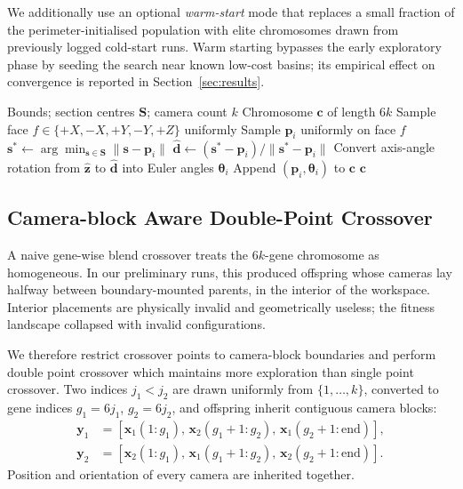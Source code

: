 \documentclass[conference]{IEEEtran}
\begin{document}
We additionally use an optional \emph{warm-start} mode that replaces a small fraction of the perimeter-initialised population with elite chromosomes drawn from previously logged cold-start runs. Warm starting bypasses the early exploratory phase by seeding the search near known low-cost basins; its empirical effect on convergence is reported in Section~\ref{sec:results}.

\begin{algorithm}[t]
\caption{Guided initial-population generation}
\label{alg:init}
\begin{algorithmic}[1]
\REQUIRE Bounds; section centres $\mathbf{S}$; camera count $k$
\ENSURE Chromosome $\mathbf{c}$ of length $6k$
\STATE Sample face $f \in \{+X,-X,+Y,-Y,+Z\}$ uniformly
\STATE Sample $\mathbf{p}_i$ uniformly on face $f$
\STATE $\mathbf{s}^\ast \gets \arg\min_{\mathbf{s}\in\mathbf{S}}\|\mathbf{s}-\mathbf{p}_i\|$
\STATE $\hat{\mathbf{d}} \gets (\mathbf{s}^\ast - \mathbf{p}_i)/\|\mathbf{s}^\ast - \mathbf{p}_i\|$
\STATE Convert axis-angle rotation from $\hat{\mathbf{z}}$ to $\hat{\mathbf{d}}$ into Euler angles $\boldsymbol{\theta}_i$
\STATE Append $(\mathbf{p}_i, \boldsymbol{\theta}_i)$ to $\mathbf{c}$
\ENDFOR
\RETURN $\mathbf{c}$
\end{algorithmic}
\end{algorithm}

\subsection{Camera-block Aware Double-Point Crossover}
A naive gene-wise blend crossover treats the $6k$-gene chromosome as homogeneous. In our preliminary runs, this produced offspring whose cameras lay halfway between boundary-mounted parents, in the interior of the workspace. Interior placements are physically invalid and geometrically useless; the fitness landscape collapsed with invalid configurations.

We therefore restrict crossover points to camera-block boundaries and perform double point crossover which maintains more exploration than single point crossover. Two indices $j_1 < j_2$ are drawn uniformly from $\{1,\ldots,k\}$, converted to gene indices $g_1 = 6j_1$, $g_2 = 6j_2$, and offspring inherit contiguous camera blocks:
\begin{align}
\mathbf{y}_1 &= [\mathbf{x}_1(1{:}g_1),\, \mathbf{x}_2(g_1{+}1{:}g_2),\, \mathbf{x}_1(g_2{+}1{:}\text{end})], \nonumber\\
\mathbf{y}_2 &= [\mathbf{x}_2(1{:}g_1),\, \mathbf{x}_1(g_1{+}1{:}g_2),\, \mathbf{x}_2(g_2{+}1{:}\text{end})].
\label{eq:crossover}
\end{align}
Position and orientation of every camera are inherited together.
\end{document}
